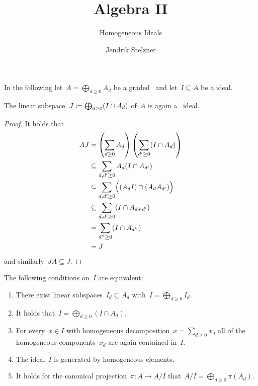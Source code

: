 \documentclass[a4paper,10pt,numbers = noenddot]{scrartcl}
\title{Algebra II}
\subtitle{Homogeneous Ideals}
\author{Jendrik Stelzner}
\date{}
\begin{document}
\maketitle

In the following let~$A = \bigoplus_{d \geq 0} A_d$ be a graded~{\kalg} and let~$I \subseteq A$ be a {\twosided} ideal.

\begin{lemma}
  The linear subspace~$J \coloneqq \bigoplus_{d \geq 0} (I \cap A_d)$ of~$A$ is again a~{\twosided} ideal.
\end{lemma}

\begin{proof}
  It holds that
  \begin{align*}
                A J
    &=          \left( \sum_{d \geq 0} A_d \right)
                \left( \sum_{d' \geq 0} (I \cap A_d) \right)  \\
    &\subseteq  \sum_{d, d' \geq 0} A_d (I \cap A_{d'}) \\
    &\subseteq  \sum_{d, d' \geq 0} \Bigl( (A_d I) \cap (A_d A_{d'}) \Bigr)  \\
    &\subseteq  \sum_{d, d' \geq 0} (I \cap A_{d+d'}) \\
    &=          \sum_{d'' \geq 0} (I \cap A_{d''})  \\
    &=          J
  \end{align*}
  and similarly~$J A \subseteq J$.
\end{proof}

\begin{proposition}
  \label{characterizations of homogeneous ideals}
  The following conditions on~$I$ are equivalent:
  \begin{enumerate}
    \item
      \label{sum of subspaces}
      There exist linear subspaces~$I_d \subseteq A_d$ with~$I = \bigoplus_{d \geq 0} I_d$.
    \item
      \label{sum of intersections}
      It holds that~$I = \bigoplus_{d \geq 0} (I \cap A_d)$.
    \item
      \label{contains homogeneous components}
      For every~$x \in I$ with homogeneous decomposition~$x = \sum_{d \geq 0} x_d$ all of the homogeneous components~$x_d$ are again contained in~$I$.
    \item
      \label{generated by homogeneous}
      The ideal~$I$ is generated by homogeneous elements.
    \item
      \label{induced grading}
      It holds for the canonical projection~$\pi \colon A \to A/I$ that~$A/I = \bigoplus_{d \geq 0} \pi(A_d)$.
  \end{enumerate}
\end{proposition}
\end{document}
